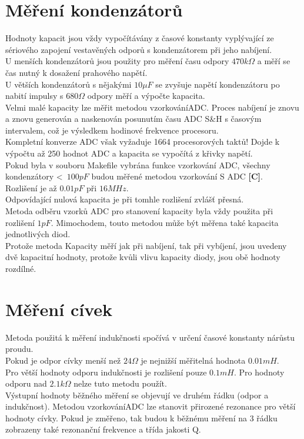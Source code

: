 \section{Měření kondenzátorů}
Hodnoty kapacit jsou vždy vypočítávány z časové konstanty vyplývající ze sériového zapojení vestavěných odporů s kondenzátorem při jeho nabíjení.\\U menších kondenzátorů jsou použity pro měření času odpory \(470k\Omega\) a měří se čas nutný k dosažení prahového napětí.\\
U větších kondenzátorů s nějakými \(10\mu F\) se zvyšuje napětí kondenzátoru po nabití impulsy s \(680\Omega\) odpory měří a výpočte kapacita.\\Velmi malé kapacity lze měřit metodou vzorkováníADC. 
Proces nabíjení je znovu a znovu generován a naskenován posunutím času  ADC S\&H s časovým intervalem,
což je výsledkem hodinové frekvence procesoru.\\Kompletní konverze ADC však vyžaduje 1664 procesorových taktů!
Dojde k výpočtu až 250 hodnot ADC a kapacita se vypočítá z křivky napětí.\\
Pokud byla v souboru Makefile vybrána funkce vzorkování ADC, všechny kondenzátory \textless~\(100pF\) budou měřené metodou vzorkování S ADC {\bf[C]}.\\ Rozlišení je až \(0.01pF\) při \(16MHz\).\\
Odpovídající nulová kapacita je při tomhle rozlišení zvlášť přesná.\\
Metoda odběru vzorků ADC pro stanovení kapacity byla vždy použita při rozlišení \(1pF\).
Mimochodem, touto metodou může být měřena také kapacita jednotlivých diod.\\ Protože metoda
Kapacity měří jak při nabíjení, tak při vybíjení, jsou uvedeny dvě kapacitní hodnoty, protože kvůli vlivu kapacity diody, jsou obě hodnoty rozdílné.

\section{Měření cívek}
Metoda použitá k měření indukčnosti spočívá v určení časové konstanty nárůstu proudu.\\
Pokud je odpor cívky menší než \(24\Omega\) je nejnižší měřitelná hodnota \(0.01mH\).\\
Pro větší hodnoty odporu indukčnosti je rozlišení pouze \(0.1mH\).
Pro hodnoty odporu nad \(2.1k\Omega\) nelze tuto metodu použít.\\ 
Výstupní hodnoty běžného měření se objevují ve druhém řádku (odpor a indukčnost).
Metodou vzorkováníADC lze stanovit přirozené rezonance pro větší hodnoty cívky.
Pokud je změřeno, tak budou k běžnému měření na 3 řádku zobrazeny také rezonanční frekvence a třída jakosti Q.

